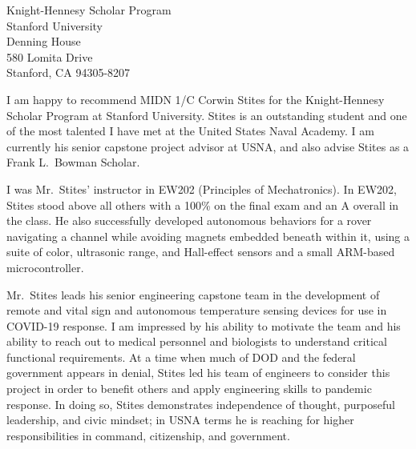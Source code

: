 \documentclass[10pt]{wrceletter}
\date{\today}
\begin{document}
\begin{letter}{%
Knight-Hennesy Scholar Program\\
Stanford University\\
Denning House\\
580 Lomita Drive\\
Stanford, CA 94305-8207}

\opening{}
\raggedright %
\setlength{\parindent}{15pt} %
I am happy to recommend MIDN 1/C Corwin Stites for the Knight-Hennesy Scholar Program at Stanford University.  Stites is an outstanding student and one of the most talented I have met at the United States Naval Academy. I am currently his senior capstone project advisor at USNA, and also advise Stites as a Frank L.~Bowman Scholar. 

I was Mr.~Stites' instructor in EW202 (Principles of Mechatronics).  In EW202, Stites stood above all others with a 100\% on the final exam and an A overall in the class. He also successfully developed autonomous behaviors for a rover navigating a channel while avoiding magnets embedded beneath within it, using a suite of color, ultrasonic range, and Hall-effect sensors and a small ARM-based microcontroller. 

Mr.~Stites leads his senior engineering capstone team in the development of remote and vital sign and autonomous temperature sensing devices for use in COVID-19 response. I am impressed by his ability to motivate the team and his ability to reach out to medical personnel and biologists to understand critical functional requirements. At a time when much of DOD and the federal government appears in denial, Stites led his team of engineers to consider this project in order to benefit others and apply engineering skills to pandemic response. In doing so, Stites demonstrates independence of thought, purposeful leadership, and civic mindset; in USNA terms he is reaching for higher responsibilities in command, citizenship, and government.


\end{letter}
\end{document}
